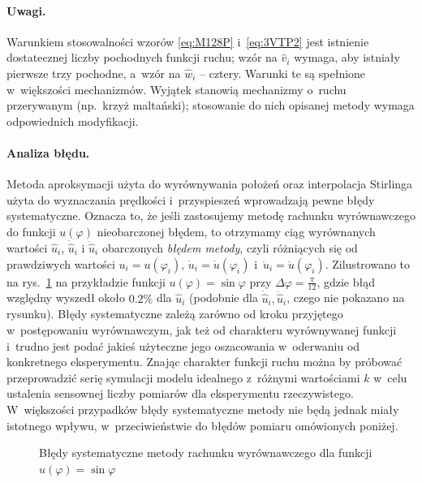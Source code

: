 \documentclass[paper=a4,DIV=12]{tmmlab}
\begin{document}
\begin{appendices}
  \paragraph{Uwagi.} Warunkiem stosowalności wzorów \eqref{eq:M128P}
  i~\eqref{eq:3VTP2} jest istnienie dostatecznej liczby pochodnych funkcji
  ruchu; wzór na $\hat{v}_i$ wymaga, aby istniały pierwsze trzy pochodne,
  a~wzór na $\hat{w}_i$ -- cztery. Warunki te są spełnione w~większości
  mechanizmów. Wyjątek stanowią mechanizmy o~ruchu przerywanym (np.~krzyż
  maltański); stosowanie do nich opisanej metody wymaga odpowiednich
  modyfikacji.

  \paragraph{Analiza błędu.} Metoda aproksymacji użyta do wyrównywania położeń
  oraz interpolacja Stirlinga użyta do wyznaczania prędkości i~przyspieszeń
  wprowadzają pewne błędy systematyczne. Oznacza to, że jeśli zastosujemy
  metodę rachunku wyrównawczego do funkcji $u(\varphi)$ nieobarczonej błędem,
  to otrzymamy ciąg wyrównanych wartości $\hat{u}_i$, $\dot{\hat{u}}_i$ i
  $\ddot{\hat{u}}_i$ obarczonych \emph{błędem metody}, czyli różniących się od
  prawdziwych wartości $u_i=u(\varphi_i)$, $\dot{u}_i=\dot{u}(\varphi_i)$
  i~$\ddot{u}_i=\ddot{u}(\varphi_i)$.  Zilustrowano to na rys.~\ref{fig:JJAAT}
  na przykładzie funkcji $u(\varphi) = \sin{\varphi}$ przy $\Delta\varphi =
  \tfrac{\pi}{12}$, gdzie błąd względny wyszedł około $0.2\%$ dla $\hat{u}_i$
  (podobnie dla $\dot{\hat{u}}_i, \ddot{\hat{u}}_i$, czego nie pokazano na
  rysunku). Błędy systematyczne zależą zarówno od kroku przyjętego
  w~postępowaniu wyrównawczym, jak też od charakteru wyrównywanej funkcji
  i~trudno jest podać jakieś użyteczne jego oszacowania w~oderwaniu od
  konkretnego eksperymentu. Znając charakter funkcji ruchu można by próbować
  przeprowadzić serię symulacji modelu idealnego z~różnymi wartościami $k$
  w~celu ustalenia sensownej liczby pomiarów dla eksperymentu rzeczywistego.
  W~większości przypadków błędy systematyczne metody nie będą jednak miały
  istotnego wpływu, w~przeciwieństwie do błędów pomiaru omówionych poniżej.
  \begin{figure}[htbp]
    \centering
    
    \caption{Błędy systematyczne metody rachunku wyrównawczego dla funkcji
             $u(\varphi)=\sin{\varphi}$}
    \label{fig:JJAAT}
  \end{figure}


\end{appendices}
\end{document}
